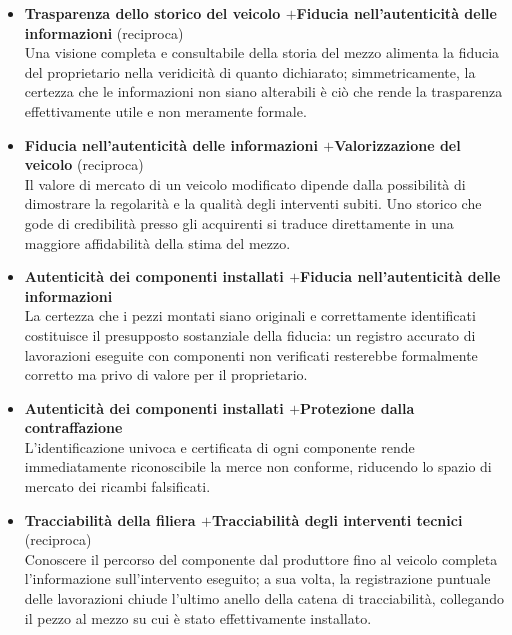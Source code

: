 \begin{itemize}
    \item \textbf{Trasparenza dello storico del veicolo \quad$+$\quad Fiducia nell'autenticit\`a delle informazioni} (reciproca)\\
    Una visione completa e consultabile della storia del mezzo alimenta la fiducia del proprietario nella veridicit\`a di quanto dichiarato; simmetricamente, la certezza che le informazioni non siano alterabili \`e ci\`o che rende la trasparenza effettivamente utile e non meramente formale.

    \item \textbf{Fiducia nell'autenticit\`a delle informazioni \quad$+$\quad Valorizzazione del veicolo} (reciproca)\\
    Il valore di mercato di un veicolo modificato dipende dalla possibilit\`a di dimostrare la regolarit\`a e la qualit\`a degli interventi subiti. Uno storico che gode di credibilit\`a presso gli acquirenti si traduce direttamente in una maggiore affidabilit\`a della stima del mezzo.

    \item \textbf{Autenticit\`a dei componenti installati \quad$+$\quad Fiducia nell'autenticit\`a delle informazioni}\\
    La certezza che i pezzi montati siano originali e correttamente identificati costituisce il presupposto sostanziale della fiducia: un registro accurato di lavorazioni eseguite con componenti non verificati resterebbe formalmente corretto ma privo di valore per il proprietario.

    \item \textbf{Autenticit\`a dei componenti installati \quad$+$\quad Protezione dalla contraffazione}\\
    L'identificazione univoca e certificata di ogni componente rende immediatamente riconoscibile la merce non conforme, riducendo lo spazio di mercato dei ricambi falsificati.

    \item \textbf{Tracciabilit\`a della filiera \quad$+$\quad Tracciabilit\`a degli interventi tecnici} (reciproca)\\
    Conoscere il percorso del componente dal produttore fino al veicolo completa l'informazione sull'intervento eseguito; a sua volta, la registrazione puntuale delle lavorazioni chiude l'ultimo anello della catena di tracciabilit\`a, collegando il pezzo al mezzo su cui \`e stato effettivamente installato.


\end{itemize}
